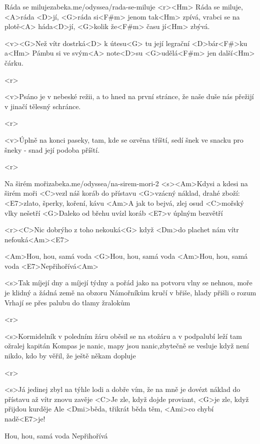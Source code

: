 \begin{song}{15}{Ráda se miluje}{zabeka.me/odyssea/rada-se-miluje}
<r><Hm> Ráda se miluje, <A>ráda <D>jí, 
<G>ráda si<F#m> jenom tak<Hm> zpívá, 
vrabci se na plotě<A> háda<D>jí, 
<G>kolik že<F#m> času jí<Hm> zbývá. 

<v><G>Než vítr dostrká<D> k útesu<G> tu její legrační <D>bár<F#>ku 
a<Hm> Pámbu si ve svým<A> note<D>su <G>udělá<F#m> jen další<Hm> čárku. 

<r>

<v>Psáno je v nebeské režii, a to hned na první stránce, 
že naše duše nás přežijí v jinačí tělesný schránce. 

<r>

<v>Úplně na konci paseky, tam, kde se ozvěna tříští, 
sedí šnek ve snacku pro šneky - snad její podoba příští. 

<r>
\end{song}
\begin{song}[Traband]{16}{Na širém moři}{zabeka.me/odyssea/na-sirem-mori-2}
<s><Am>Kdysi a kdesi na širém moři <C>vezl náš koráb do přístavu 
<G>vzácný náklad, drahé zboží: <E7>zlato, šperky, koření, kávu 
<Am>A jak to bejvá, zlej osud <C>mořský vlky nešetří 
<G>Daleko od břehu uvízl koráb <E7>v úplným bezvětří 

<r><C>Nic dobrýho z toho nekouká<G>
když <Dm>do plachet nám vítr nefouká<Am><E7>

<Am>Hou, hou, samá voda 
<G>Hou, hou, samá voda 
<Am>Hou, hou, samá voda 
<E7>Nepřihořívá<Am>

<s>Tak míjejí dny a míjejí týdny a pořád jako na potvoru 
vlny se nehnou, moře je klidný a žádná země na obzoru 
Námořníkům kručí v břiše, hlady přišli o rozum 
Vrhají se přes palubu do tlamy žralokům 

<r>

<s>Kormidelník v poledním žáru oběsil se na stožáru 
a v podpalubí leží tam ožralej kapitán 
Kompas je nanic, mapy jsou nanic,zbytečně se vesluje 
když není nikdo, kdo by věřil, že ještě někam dopluje 

<r>

<s>Já jedinej zbyl na týhle lodi a dobře vím, že na mně je 
dovézt náklad do přístavu až vítr znovu zavěje 
<C>Je zle, když dojde proviant, <G>je zle, když přijdou kurděje 
Ale <Dmi>běda, třikrát běda těm, <Ami>co chybí nadě<E7>je! 

Hou, hou, samá voda 
Nepřihořívá 

\end{song}
